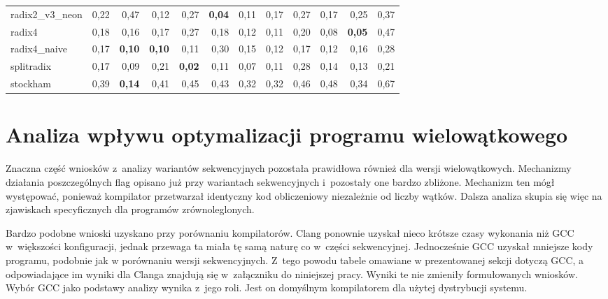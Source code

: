 \begin{table}[H]
\begin{tabular}{lrrrrrrrrrrr}
radix2\_v3\_neon & 0,22 & 0,47 & 0,12 & 0,27 & \textbf{0,04} & 0,11 & 0,17 & 0,27 & 0,17 & 0,25 & 0,37 \\
radix4 & 0,18 & 0,16 & 0,17 & 0,27 & 0,18 & 0,12 & 0,11 & 0,20 & 0,08 & \textbf{0,05} & 0,47 \\
radix4\_naive & 0,17 & \textbf{0,10} & \textbf{0,10} & 0,11 & 0,30 & 0,15 & 0,12 & 0,17 & 0,12 & 0,16 & 0,28 \\
splitradix & 0,17 & 0,09 & 0,21 & \textbf{0,02} & 0,11 & 0,07 & 0,11 & 0,28 & 0,14 & 0,13 & 0,21 \\
stockham & 0,39 & \textbf{0,14} & 0,41 & 0,45 & 0,43 & 0,32 & 0,32 & 0,46 & 0,48 & 0,34 & 0,67 \\
\bottomrule
\end{tabular}
\end{table}



\section{Analiza wpływu optymalizacji programu wielowątkowego}
Znaczna część wniosków z~analizy wariantów sekwencyjnych pozostała prawidłowa również 
dla wersji wielowątkowych.
Mechanizmy działania poszczególnych flag opisano już przy wariantach
sekwencyjnych i~pozostały one bardzo zbliżone. Mechanizm ten mógł występować, ponieważ kompilator przetwarzał
identyczny kod obliczeniowy niezależnie od liczby wątków. Dalsza analiza skupia się więc na zjawiskach specyficznych dla programów
zrównoleglonych.

Bardzo podobne wnioski uzyskano przy porównaniu kompilatorów. Clang ponownie uzyskał nieco krótsze
czasy wykonania niż GCC w~większości konfiguracji, jednak przewaga ta miała tę samą
naturę co w~części sekwencyjnej. Jednocześnie GCC uzyskał mniejsze kody programu, podobnie jak w porównaniu wersji sekwencyjnych. Z~tego powodu tabele
omawiane w prezentowanej sekcji dotyczą GCC, a odpowiadające im wyniki dla Clanga znajdują się
w~załączniku do niniejszej pracy. Wyniki te nie zmieniły formułowanych wniosków.
Wybór GCC jako podstawy analizy wynika
z~jego roli. Jest on domyślnym kompilatorem dla użytej dystrybucji systemu.


